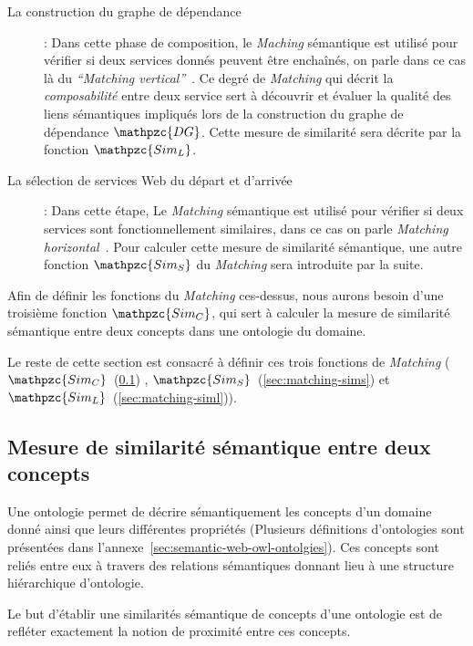 \begin{description}
\item [La construction du graphe de dépendance]: Dans cette phase de
  composition, le \emph{Maching} sémantique est utilisé pour vérifier
  si deux services donnés peuvent être enchaînés, on parle dans ce cas
  là du \emph{``Matching vertical''}~\cite{temglit2012graph}. Ce degré
  de \emph{Matching} qui décrit la \emph{composabilité} entre deux
  service sert à découvrir et évaluer la qualité des liens sémantiques
  impliqués lors de la construction du graphe de dépendance
  $\mathpzc{DG}$. Cette mesure de similarité sera décrite par la
  fonction {\large $\mathpzc{Sim_L}$}.\

\item [La sélection de services Web du départ et d'arrivée]: Dans
  cette étape, Le \emph{Matching} sémantique est utilisé pour vérifier
  si deux services sont fonctionnellement similaires, dans ce cas on
  parle \emph{Matching horizontal}~\cite{temglit2012graph}. Pour
  calculer cette mesure de similarité sémantique, une autre fonction
  {\large $\mathpzc{Sim_S}$} du \emph{Matching} sera introduite par la
  suite.\medskip
\end{description}

Afin de définir les fonctions du \emph{Matching} ces-dessus, nous
aurons besoin d'une troisième fonction {\large $\mathpzc{Sim_C}$}, qui
sert à calculer la mesure de similarité sémantique entre deux concepts
dans une ontologie du domaine.\medskip

Le reste de cette section est consacré à définir ces trois fonctions
de \emph{Matching} ({\large
  $\mathpzc{Sim_C}$}~(\ref{sec:matching-simc}) , {\large
  $\mathpzc{Sim_S}$}~(\ref{sec:matching-sims}) et {\large
  $\mathpzc{Sim_L}$}~(\ref{sec:matching-siml})).

\subsection{Mesure de similarité sémantique entre deux concepts}
\label{sec:matching-simc}

Une ontologie permet de décrire sémantiquement les concepts d'un
domaine donné ainsi que leurs différentes propriétés (Plusieurs
définitions d'ontologies sont présentées dans
l'annexe~\ref{sec:semantic-web-owl-ontolgies}). Ces concepts sont
reliés entre eux à travers des relations sémantiques donnant lieu à
une structure hiérarchique d'ontologie.\medskip

Le but d'établir une similarités sémantique de concepts d'une
ontologie est de refléter exactement la notion de proximité entre ces
concepts.\medskip

